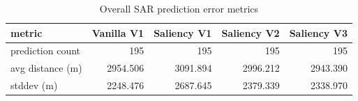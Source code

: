 \begin{table}[ht]
\centering
\caption{Overall SAR prediction error metrics}
\label{tab:sar-overall-errors}
\begin{tabular}{lrrrr}
\hline
metric & Vanilla V1 & Saliency V1 & Saliency V2 & Saliency V3 \\
\hline
prediction count & 195 & 195 & 195 & 195 \\
avg distance (m) & 2954.506 & 3091.894 & 2996.212 & 2943.390 \\
stddev (m) & 2248.476 & 2687.645 & 2379.339 & 2338.970 \\
\hline
\end{tabular}
\end{table}
